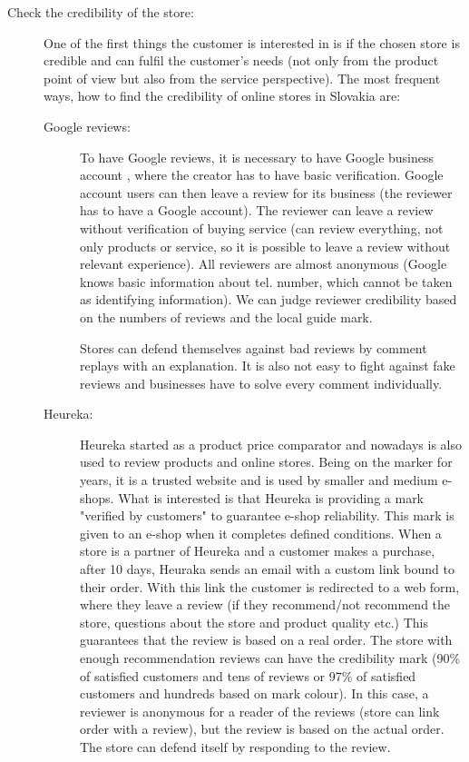 \documentclass[thesis=M,english]{FITthesis}[2019/12/23]
\begin{document}
\begin{description} \label{reviews}
\item[Check the credibility of the store:]
One of the first things the customer is interested in is if the chosen store is credible and can fulfil the customer's needs (not only from the product point of view but also from the service perspective). The most frequent ways, how to find the credibility of online stores in Slovakia are:
\begin{description}

\item[Google reviews: ] To have Google reviews, it is necessary to have Google business account \cite{googleBusiness}, where the creator has to have basic verification. Google account users can then leave a review for its business (the reviewer has to have a Google account). The reviewer can leave a review without verification of buying service (can review everything, not only products or service, so it is possible to leave a review without relevant experience). All reviewers are almost anonymous (Google knows basic information about tel. number, which cannot be taken as identifying information). We can judge reviewer credibility based on the numbers of reviews and the local guide mark. 

Stores can defend themselves against bad reviews by comment replays with an explanation. It is also not easy to fight against fake reviews and businesses have to solve every comment individually. \cite{googleReviews}

\item[Heureka: ] Heureka started as a product price comparator and nowadays is also used to review products and online stores. Being on the marker for years, it is a trusted website and is used by smaller and medium e-shops. What is interested is that Heureka is providing a mark "verified by customers" to guarantee e-shop reliability. This mark is given to an e-shop when it completes defined conditions. 
When a store is a partner of Heureka and a customer makes a purchase, after 10 days, Heuraka sends an email with a custom link bound to their order. With this link the customer is redirected to a web form, where they leave a review (if they recommend/not recommend the store, questions about the store and product quality etc.) This guarantees that the review is based on a real order. The store with enough recommendation reviews can have the credibility mark (90\% of satisfied customers and tens of reviews or 97\% of satisfied customers and hundreds based on mark colour).
In this case, a reviewer is anonymous for a reader of the reviews (store can link order with a review), but the review is based on the actual order. The store can defend itself by responding to the review. \cite{overenozakazniky}


\end{description}
\end{description}
\end{document}
